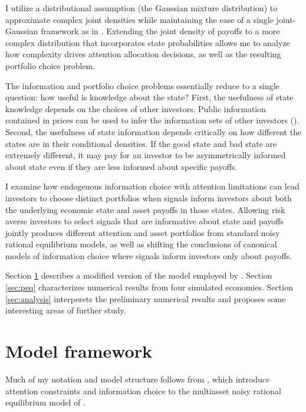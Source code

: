 \documentclass{article}
\begin{document}
I utilize a distributional assumption (the Gaussian mixture distribution) to approximate complex joint densities while maintaining the ease of a single joint-Gaussian framework as in \textcite{kacperczyk_rational_2016}. Extending the joint density of payoffs to a more complex distribution that incorporates state probabilities allows me to analyze how complexity drives attention allocation decisions, as well as the resulting portfolio choice problem.

The information and portfolio choice problems essentially reduce to a single question: how useful is knowledge about the state? First, the usefulness of state knowledge depends on the choices of other investors. Public information contained in prices can be used to infer the information sets of other investors (\textcite{grossman_existence_1977}). Second, the usefulness of state information depends critically on how different the states are in their conditional densities. If the good state and bad state are extremely different, it may pay for an investor to be asymmetrically informed about state even if they are less informed about specific payoffs.

I examine how endogenous information choice with attention limitations can lead investors to choose distinct portfolios when signals inform investors about both the underlying economic state and asset payoffs in those states. Allowing risk averse investors to select signals that are informative about state and payoffs jointly produces different attention and asset portfolios from standard noisy rational equilibrium models, as well as shifting the conclusions of canonical models of information choice where signals inform investors only about payoffs. 

Section \ref{sec:model} describes a modified version of the model employed by \textcite{kacperczyk_rational_2016}. Section \ref{sec:peq} characterizes numerical results from four simulated economies. Section \ref{sec:analysis} interperets the preliminary numerical results and proposes some interesting areas of further study.

\section{Model framework}\label{sec:model}

Much of my notation and model structure follows from \textcite{kacperczyk_rational_2016}, which introduce attention constraints and information choice to the multiasset noisy rational equilibrium model of \textcite{admati_noisy_1985}.
\end{document}
